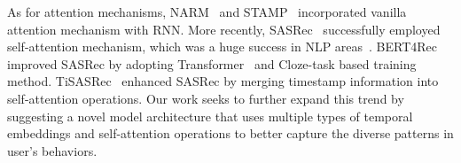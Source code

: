As for attention mechanisms, NARM~\cite{NARM} and STAMP~\cite{STAMP} incorporated vanilla attention mechanism with RNN. More recently, SASRec~\cite{SASRec} successfully employed self-attention mechanism, which was a huge success in NLP areas~\cite{TRANSFORMER, BERT, TRANSFORMER-XL, XLNET}. BERT4Rec~\cite{BERT4Rec} improved SASRec by adopting Transformer~\cite{TRANSFORMER} and Cloze-task based training method. TiSASRec~\cite{TISASRec} enhanced SASRec by merging timestamp information into self-attention operations. Our work seeks to further expand this trend by suggesting a novel model architecture that uses multiple types of temporal embeddings  and self-attention operations to better capture the diverse patterns in user's behaviors.
